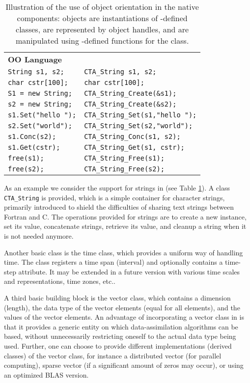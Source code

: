 \begin{table}
\centering
\begin{tabular}{l l}
\textbf{OO Language}       &	\textbf{\oda}\\
\verb|String s1, s2;|      &	\verb|CTA_String s1, s2;|\\
\verb|char cstr[100];| &	\verb|char cstr[100];|\\
\verb|S1 = new String;|    &	\verb|CTA_String_Create(&s1);|\\
\verb|s2 = new String;|    &	\verb|CTA_String_Create(&s2);|\\
\verb|s1.Set("hello ");|   &	\verb|CTA_String_Set(s1,"hello ");|\\
\verb|s2.Set("world");|    &	\verb|CTA_String_Set(s2,"world");|\\
\verb|s1.Conc(s2);|        &	\verb|CTA_String_Conc(s1, s2);|\\
\verb|s1.Get(cstr);|       &	\verb|CTA_String_Get(s1, cstr);|\\
\verb|free(s1);|           &	\verb|CTA_String_Free(s1);|\\
\verb|free(s2);|           &	\verb|CTA_String_Free(s2);|\\
\end{tabular}
\caption{Illustration of the use of object orientation in the \oda native components: objects are instantiations of \oda-defined classes, are represented by object handles, and are manipulated using \oda-defined functions for the class.}\label{tab:OO}
\end{table}

As an example we consider the support for strings in \oda (see Table \ref{tab:OO}). A class \verb|CTA_String| is provided, which is a simple container for character strings, primarily introduced to shield the difficulties of sharing text strings between Fortran and C. The operations provided for \oda strings are to create a new instance, set its value, concatenate strings, retrieve its value, and cleanup a string when it is not needed anymore. 

Another basic class is the \oda time class, which provides a uniform way of handling time. The class registers a time span (interval) and optionally contains a time-step attribute. It may be extended in a future version with various time scales and representations, time zones, etc..

A third basic building block is the \oda vector class, which contains a dimension (length), the data type of the vector elements (equal for all elements), and the values of the vector elements. An advantage of incorporating a vector class in \oda is that it provides a generic entity on which data-assimilation algorithms can be based, without unnecessarily restricting oneself to the actual data type being used. Further, one can choose to provide different implementations (derived classes) of the vector class, for instance a distributed vector (for parallel computing), sparse vector (if a significant amount of zeros may occur), or using an optimized BLAS version.


